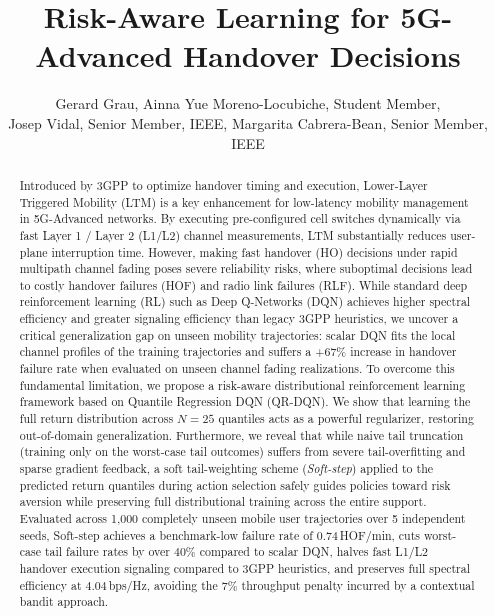 \documentclass{ieeetmlcn}
\begin{document}
\jvol{--}


\title{Risk-Aware Learning for 5G-Advanced Handover Decisions}

\author{Gerard Grau, Ainna Yue Moreno-Locubiche, Student Member,\\ Josep Vidal, Senior Member, IEEE, Margarita Cabrera-Bean, Senior Member, IEEE}


\begin{abstract}
Introduced by 3GPP to optimize handover timing and execution, Lower-Layer Triggered Mobility (LTM) is a key enhancement for low-latency mobility management in 5G-Advanced networks. By executing pre-configured cell switches dynamically via fast Layer 1 / Layer 2 (L1/L2) channel measurements, LTM substantially reduces user-plane interruption time. However, making fast handover (HO) decisions under rapid multipath channel fading poses severe reliability risks, where suboptimal decisions lead to costly handover failures (HOF) and radio link failures (RLF). While standard deep reinforcement learning (RL) such as Deep Q-Networks (DQN) achieves higher spectral efficiency and greater signaling efficiency than legacy 3GPP heuristics, we uncover a critical generalization gap on unseen mobility trajectories: scalar DQN fits the local channel profiles of the training trajectories and suffers a +67\% increase in handover failure rate when evaluated on unseen channel fading realizations. To overcome this fundamental limitation, we propose a risk-aware distributional reinforcement learning framework based on Quantile Regression DQN (QR-DQN). We show that learning the full return distribution across $N=25$ quantiles acts as a powerful regularizer, restoring out-of-domain generalization. Furthermore, we reveal that while naive tail truncation (training only on the worst-case tail outcomes) suffers from severe tail-overfitting and sparse gradient feedback, a soft tail-weighting scheme (\emph{Soft-step}) applied to the predicted return quantiles during action selection safely guides policies toward risk aversion while preserving full distributional training across the entire support. Evaluated across 1,000 completely unseen mobile user trajectories over 5 independent seeds, Soft-step achieves a benchmark-low failure rate of $0.74$\,HOF/min, cuts worst-case tail failure rates by over $40\%$ compared to scalar DQN, halves fast L1/L2 handover execution signaling compared to 3GPP heuristics, and preserves full spectral efficiency at $4.04$\,bps/Hz, avoiding the $7\%$ throughput penalty incurred by a contextual bandit approach.
\end{abstract}
\end{document}
